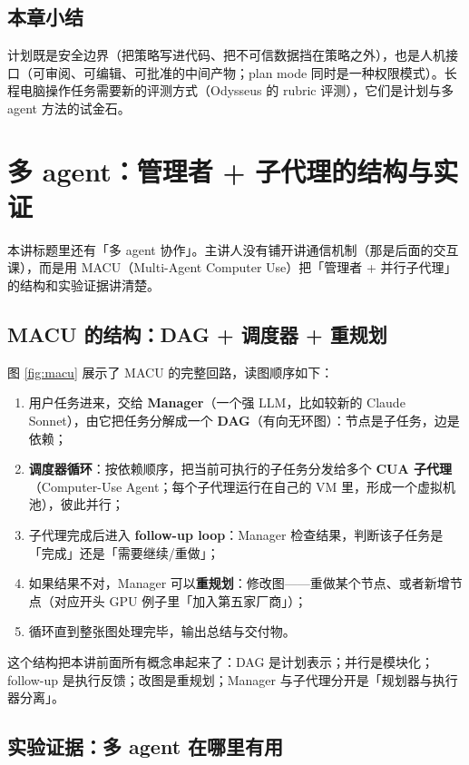 \documentclass[a4paper]{article}
\begin{document}
\subsection{本章小结}
计划既是安全边界（把策略写进代码、把不可信数据挡在策略之外），也是人机接口（可审阅、可编辑、可批准的中间产物；plan mode 同时是一种权限模式）。长程电脑操作任务需要新的评测方式（Odysseus 的 rubric 评测），它们是计划与多 agent 方法的试金石。

\section{多 agent：管理者 + 子代理的结构与实证}

本讲标题里还有「多 agent 协作」。主讲人没有铺开讲通信机制（那是后面的交互课），而是用 MACU（Multi-Agent Computer Use）把「管理者 + 并行子代理」的结构和实验证据讲清楚。

\subsection{MACU 的结构：DAG + 调度器 + 重规划}

图 \ref{fig:macu} 展示了 MACU 的完整回路，读图顺序如下：

\begin{enumerate}
\item 用户任务进来，交给 \textbf{Manager}（一个强 LLM，比如较新的 Claude Sonnet），由它把任务分解成一个 \textbf{DAG}（有向无环图）：节点是子任务，边是依赖；
\item \textbf{调度器循环}：按依赖顺序，把当前可执行的子任务分发给多个 \textbf{CUA 子代理}（Computer-Use Agent；每个子代理运行在自己的 VM 里，形成一个虚拟机池），彼此并行；
\item 子代理完成后进入 \textbf{follow-up loop}：Manager 检查结果，判断该子任务是「完成」还是「需要继续/重做」；
\item 如果结果不对，Manager 可以\textbf{重规划}：修改图——重做某个节点、或者新增节点（对应开头 GPU 例子里「加入第五家厂商」）；
\item 循环直到整张图处理完毕，输出总结与交付物。
\end{enumerate}

这个结构把本讲前面所有概念串起来了：DAG 是计划表示；并行是模块化；follow-up 是执行反馈；改图是重规划；Manager 与子代理分开是「规划器与执行器分离」。

\subsection{实验证据：多 agent 在哪里有用}
\end{document}
